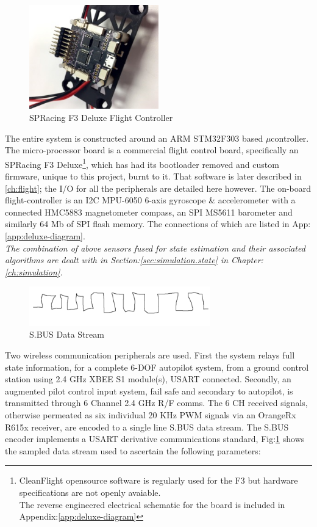 \par
\begin{figure}[htbp]
\centering
\includegraphics[width=0.5\textwidth]{figs/f3-deluxe}
\caption{SPRacing F3 Deluxe Flight Controller}
\end{figure}
The entire system is constructed around an ARM STM32F303\cite{stm32f303} based $\mu$controller. The micro-processor board is a commercial flight control board, specifically an SPRacing F3 Deluxe\cite{spracing}\footnote{CleanFlight opensource software is regularly used for the F3 but hardware specifications are not openly avaiable.\\The reverse engineered electrical schematic for the board is included in Appendix:\ref{app:deluxe-diagram}}, which has had its bootloader removed and custom firmware, unique to this project, burnt to it. That software is later described in \ref{ch:flight}; the I/O for all the peripherals are detailed here however. The on-board flight-controller is an I2C MPU-6050\cite{mpu6050} 6-axis gyroscope \& accelerometer with a connected HMC5883\cite{hmc5883} magnetometer compass, an SPI MS5611\cite{ms5611} barometer and similarly 64 Mb of SPI flash memory. The connections of which are listed in App:\ref{app:deluxe-diagram}. 
\\
\emph{\color{Gray} The combination of above sensors fused for state estimation and their associated algorithms are dealt with in Section:\ref{sec:simulation.state} in Chapter:\ref{ch:simulation}.}
\par
\begin{figure}[hbtp]
\centering
\includegraphics[width=0.7\textwidth]{figs/sbus}
\caption{S.BUS Data Stream}
\label{fig:sbus}
\end{figure}
Two wireless communication peripherals are used. First the system relays full state information, for a complete 6-DOF autopilot system, from a ground control station using 2.4 GHz XBEE S1 module(s)\cite{xbees1}, USART connected. Secondly, an augmented pilot control input system, fail safe and secondary to autopilot, is transmitted through 6 Channel 2.4 GHz R/F comms. The 6 CH received signals, otherwise permeated as six individual 20 KHz PWM signals via an OrangeRx R615x\cite{r615x} receiver, are encoded to a single line S.BUS data stream. The S.BUS encoder \cite{sbusencoder} implements a USART derivative communications standard, Fig:\ref{fig:sbus} shows the sampled data stream used to ascertain the following parameters:
